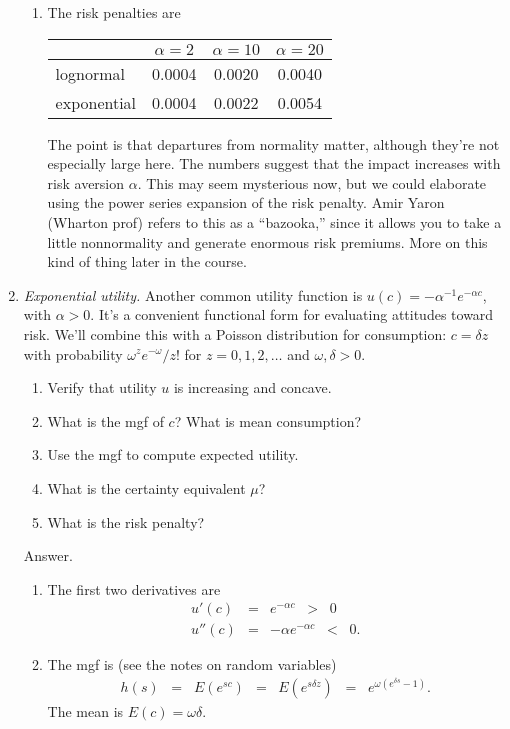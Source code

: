\documentclass[11pt]{article}
\begin{document}
\begin{enumerate}
\begin{enumerate}
\item The risk penalties are
%
\begin{center}
\begin{tabular}{lccc}
\toprule
        & $\alpha=2$  & $\alpha=10$  & $\alpha=20$ \\
\midrule
lognormal    &  0.0004 & 0.0020 & 0.0040 \\
exponential  &  0.0004 & 0.0022 & 0.0054 \\
\bottomrule
\end{tabular}
\end{center}
%
The point is that departures from normality matter, although they're not
especially large here.
The numbers suggest that the impact increases with risk aversion $\alpha$.
This may seem mysterious now,
but we could elaborate using the power series expansion of the risk penalty.
Amir Yaron (Wharton prof) refers to this as a ``bazooka,''
since it allows you to take a little nonnormality
and generate enormous risk premiums.
More on this kind of thing later in the course.
\end{enumerate}


\item {\it Exponential utility.\/}
Another common utility function is $u(c) = -\alpha^{-1} e^{-\alpha c} $,
with $\alpha > 0$.
It's a convenient functional form for evaluating attitudes toward risk.
We'll combine this with a Poisson distribution for consumption:
$c = \delta z$ with probability $ \omega^z e^{-\omega} /z!$ for $z = 0, 1, 2, \ldots $
and $\omega,\delta > 0$.
\begin{enumerate}
\item Verify that utility $u$ is increasing and concave.
\item What is the mgf of $c$?  What is mean consumption?
\item Use the mgf to compute expected utility.
\item What is the certainty equivalent $\mu$?
\item What is the risk penalty?
\end{enumerate}
%
Answer.
\begin{enumerate}
\item The first two derivatives are
\begin{eqnarray*}
    u'(c) &=& e^{-\alpha c} \;\;>\;\; 0 \\
    u''(c) &=& -\alpha e^{-\alpha c} \;\;<\;\; 0 .
\end{eqnarray*}

\item The mgf is (see the notes on random variables)
\begin{eqnarray*}
    h(s) \;\;=\;\;  E(e^{sc}) &=& E(e^{s\delta z}) \;\;=\;\;  e^{\omega (e^{\delta s} -1)} .
\end{eqnarray*}
The mean is $ E(c) = \omega\delta $.


\end{enumerate}
\end{enumerate}
\end{document}
